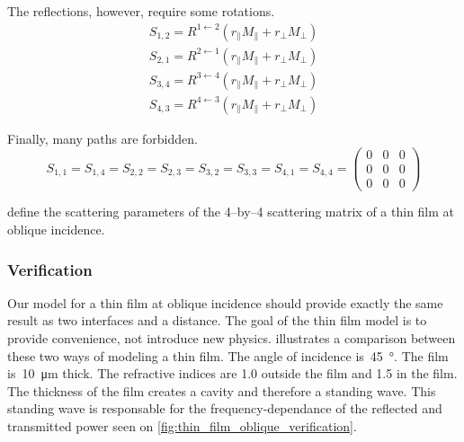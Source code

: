 The reflections, however, require some rotations.
\begin{subequations}
    \begin{align}
        S_{1, 2} = R^{1 \leftarrow 2} (r_\parallel M_\parallel + r_\perp M_\perp) \\
        S_{2, 1} = R^{2 \leftarrow 1} (r_\parallel M_\parallel + r_\perp M_\perp) \\
        S_{3, 4} = R^{3 \leftarrow 4} (r_\parallel M_\parallel + r_\perp M_\perp) \\
        S_{4, 3} = R^{4 \leftarrow 3} (r_\parallel M_\parallel + r_\perp M_\perp)
    \end{align}
    \label{eq:thin_film_s_r}
\end{subequations}

Finally, many paths are forbidden.
\begin{equation}
    S_{1, 1} = S_{1, 4} = S_{2, 2} = S_{2, 3} =
    S_{3, 2} = S_{3, 3} = S_{4, 1} = S_{4, 4} = 
    \begin{pmatrix}
        0&0&0\\0&0&0\\0&0&0
    \end{pmatrix}
    \label{eq:thin_film_s_zero}
\end{equation}

 define the scattering parameters of the 4--by--4 scattering matrix of a thin film at oblique incidence.


\subsubsection{Verification}
Our model for a thin film at oblique incidence should provide exactly the same result as two interfaces and a distance.
The goal of the thin film model is to provide convenience, not introduce new physics.
 illustrates a comparison between these two ways of modeling a thin film.
The angle of incidence is~\SI{45}{\degree}.
The film is~\SI{10}{\micro\meter} thick.
The refractive indices are 1.0 outside the film and 1.5 in the film.
The thickness of the film creates a cavity and therefore a standing wave.
This standing wave is responsable for the frequency-dependance of the reflected and transmitted power seen on \cref{fig:thin_film_oblique_verification}.

